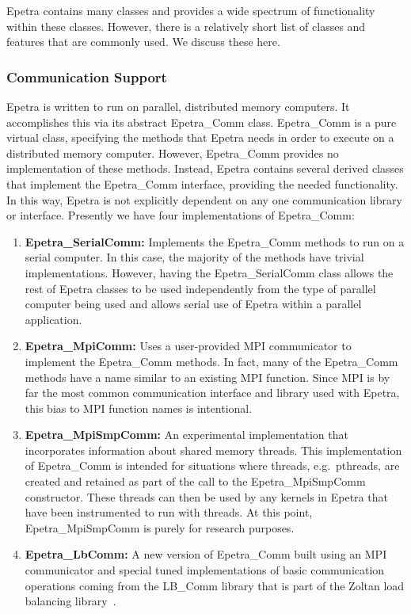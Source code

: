 \documentclass[12pt,relax]{EpetraUserGuide}
\newcommand{\comm}{Epetra\_Comm}
\newcommand{\serialcomm}{Epetra\_SerialComm}
\newcommand{\mpicomm}{Epetra\_MpiComm}
\newcommand{\mpismpcomm}{Epetra\_MpiSmpComm}
\newcommand{\lbcomm}{Epetra\_LbComm}
\begin{document}
Epetra contains many classes and provides a wide spectrum of
functionality within these classes.  However, there is a relatively
short list of classes and features that are commonly used.  We discuss
these here.

\subsubsection{Communication Support}
Epetra is written to run on parallel, distributed memory computers.  It accomplishes
this via its abstract \comm{} class.  \comm{} is a pure virtual class,
specifying the methods that Epetra needs in order to execute on a
distributed memory computer.  However, \comm{} provides no
implementation of these methods.  Instead, Epetra contains
several derived classes that implement the \comm{} interface,
providing the needed functionality.  In this way, Epetra is not
explicitly dependent on any one communication library or interface.
Presently we have four implementations of \comm{}:
\begin{enumerate}
\item {\bf \serialcomm{}: } Implements the \comm{}
methods to run on a serial computer.  In this case, the majority of
the methods have trivial implementations.  However, having the
\serialcomm{} class allows the rest of Epetra classes to be used
independently from the type of parallel computer being used and allows
serial use of Epetra within a parallel application.
\item {\bf \mpicomm{}: } Uses a user-provided MPI
communicator to implement the \comm{} methods.  In fact, many of the
\comm{} methods have a name similar to an existing MPI function.
Since MPI is by far the most common communication interface and
library used with Epetra, this bias to MPI function names is
intentional.
\item {\bf \mpismpcomm{}:} An experimental implementation that
incorporates information about shared memory threads.  This
implementation of \comm{} is intended for situations where threads,
e.g.~pthreads, are created and retained as part of the call to the
\mpismpcomm{} constructor.  These threads can then be used by any
kernels in Epetra that have been instrumented to run with threads.  At
this point, \mpismpcomm{} is purely for research purposes.
\item {\bf \lbcomm{}: } A new version of \comm{} built using an MPI
communicator and special tuned implementations of basic communication
operations coming from the LB\_Comm library that is part of the Zoltan
load balancing library~\cite{zoltan-ug}.
\end{enumerate}
\end{document}
